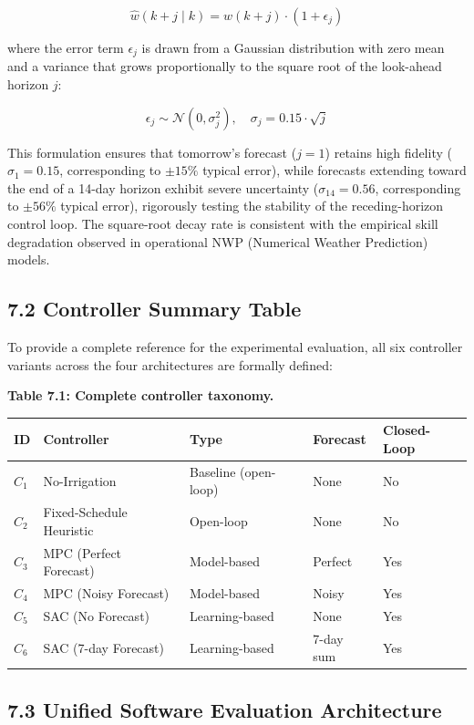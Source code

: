 \[\hat{w}(k+j \mid k) = w(k+j) \cdot (1 + \epsilon_j) \tag{26}\]

where the error term \(\epsilon_j\) is drawn from a Gaussian
distribution with zero mean and a variance that grows proportionally to
the square root of the look-ahead horizon \(j\):

\[\epsilon_j \sim \mathcal{N}(0, \sigma_j^2), \quad \sigma_j = 0.15 \cdot \sqrt{j} \tag{27}\]

This formulation ensures that tomorrow's forecast (\(j = 1\)) retains
high fidelity (\(\sigma_1 = 0.15\), corresponding to \(\pm 15\%\)
typical error), while forecasts extending toward the end of a 14-day
horizon exhibit severe uncertainty (\(\sigma_{14} = 0.56\),
corresponding to \(\pm 56\%\) typical error), rigorously testing the
stability of the receding-horizon control loop. The square-root decay
rate is consistent with the empirical skill degradation observed in
operational NWP (Numerical Weather Prediction) models.

\subsection{7.2 Controller Summary
Table}\label{controller-summary-table}

To provide a complete reference for the experimental evaluation, all six
controller variants across the four architectures are formally defined:

\textbf{Table 7.1: Complete controller taxonomy.}

\begin{longtable}[]{@{}lllll@{}}
\toprule\noalign{}
ID & Controller & Type & Forecast & Closed-Loop \\
\midrule\noalign{}
\endhead
\bottomrule\noalign{}
\endlastfoot
\(C_1\) & No-Irrigation & Baseline (open-loop) & None & No \\
\(C_2\) & Fixed-Schedule Heuristic & Open-loop & None & No \\
\(C_3\) & MPC (Perfect Forecast) & Model-based & Perfect & Yes \\
\(C_4\) & MPC (Noisy Forecast) & Model-based & Noisy & Yes \\
\(C_5\) & SAC (No Forecast) & Learning-based & None & Yes \\
\(C_6\) & SAC (7-day Forecast) & Learning-based & 7-day sum & Yes \\
\end{longtable}

\subsection{7.3 Unified Software Evaluation
Architecture}\label{unified-software-evaluation-architecture}

